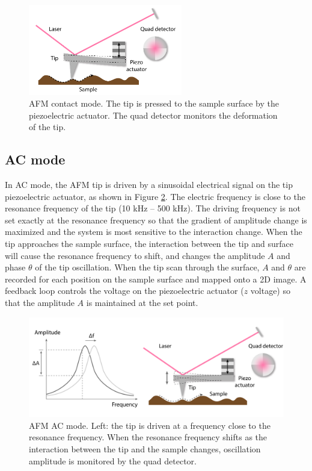 \documentclass[pdflatex, sectionletters, 12pt]{pittetd}    %
\begin{document}
\begin{figure}[h!]
	\centering
	\includegraphics[width=0.6\textwidth]{Drawing/ContactAFM.pdf}
	\caption{AFM contact mode. The tip is pressed to the sample surface by the piezoelectric actuator. The quad detector monitors the deformation of the tip.}
	\label{FIG:ContactAFM}
\end{figure}


\subsection{AC mode}

In AC mode, the AFM tip is driven by a sinusoidal electrical signal on the tip piezoelectric actuator, as shown in Figure \ref{FIG:ACAFM}. The electric frequency is close to the resonance frequency of the tip (10 kHz -- 500 kHz). The driving frequency is not set exactly at the resonance frequency so that the gradient of amplitude change is maximized and the system is most sensitive to the interaction change. When the tip approaches the sample surface, the interaction between the tip and surface will cause the resonance frequency to shift, and changes the amplitude $A$ and phase $\theta$ of the tip oscillation. When the tip scan through the surface, $A$ and $\theta$ are recorded for each position on the sample surface and mapped onto a 2D image. A feedback loop controls the voltage on the piezoelectric actuator ($z$ voltage) so that the amplitude $A$ is maintained at the set point.
\\

\begin{figure}[h!]
	\centering
	\includegraphics[width=1.0\textwidth]{Drawing/ACAFM.pdf}
	\caption{AFM AC mode. Left: the tip is driven at a frequency close to the resonance frequency. When the resonance frequency shifts as the interaction between the tip and the sample changes, oscillation amplitude is monitored by the quad detector.}
	\label{FIG:ACAFM}
\end{figure}
\end{document}
